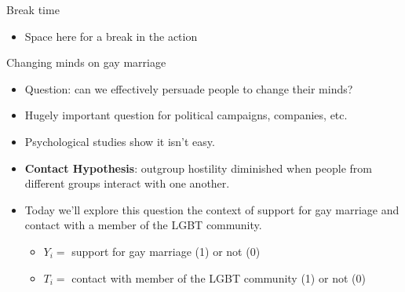 \documentclass[
  ignorenonframetext,
]{beamer}
\providecommand{\tightlist}{%
  \setlength{\itemsep}{0pt}\setlength{\parskip}{0pt}}
\begin{document}
\begin{frame}{Break time}
\label{break-time}
\begin{itemize}
\tightlist
\item
  Space here for a break in the action
\end{itemize}
\end{frame}

\begin{frame}{Changing minds on gay marriage}
\label{changing-minds-on-gay-marriage}
\begin{itemize}
\tightlist
\item
  Question: can we effectively persuade people to change their minds?
  \pause
\item
  Hugely important question for political campaigns, companies, etc.
  \pause
\item
  Psychological studies show it isn't easy. \pause
\item
  \textbf{Contact Hypothesis}: outgroup hostility diminished when people
  from different groups interact with one another. \pause
\item
  Today we'll explore this question the context of support for gay
  marriage and contact with a member of the LGBT community. \pause

  \begin{itemize}
  \tightlist
  \item
    \(Y_i =\) support for gay marriage (1) or not (0) \pause
  \item
    \(T_i =\) contact with member of the LGBT community (1) or not (0)
  \end{itemize}
\end{itemize}
\end{frame}
\end{document}
